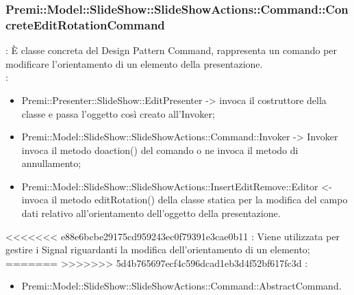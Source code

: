 {                     \subsubsection{Premi::Model::SlideShow::SlideShowActions::Command::ConcreteEditRotationCommand}{
				\textbf{\tipo}: È classe concreta del Design Pattern Command, rappresenta un comando per modificare l'orientamento di un elemento della presentazione.\\	
				\textbf{\relaz}: 
				\begin{itemize}
					\item Premi::Presenter::SlideShow::EditPresenter -> invoca il costruttore della classe e passa l’oggetto così creato all’Invoker;
					\item Premi::Model::SlideShow::SlideShowActions::Command::Invoker -> Invoker invoca il metodo doaction() del comando o ne invoca il metodo di annullamento;
                    \item Premi::Model::SlideShow::SlideShowActions::InsertEditRemove::Editor <- invoca il metodo editRotation() della classe statica per la modifica del campo dati relativo all'orientamento dell'oggetto della presentazione.
				\end{itemize}	
<<<<<<< e88e6bcbe29175cd959243ec0f79391e3cae0b11
                \textbf{\interfacce}: Viene utilizzata per gestire i Signal riguardanti la modifica dell'orientamento di un elemento;\\
=======
>>>>>>> 5d4b765697ecf4c596dcad1eb3d4f52bf617fc3d
                \textbf{\base}: 
                    \begin{itemize}
                    \item Premi::Model::SlideShow::SlideShowActions::Command::AbstractCommand.
                    \end{itemize}
                    }
}
